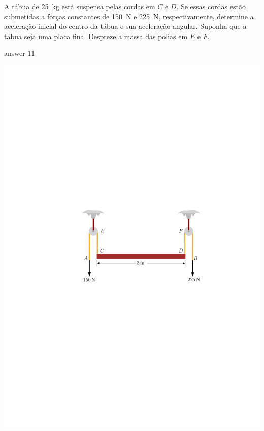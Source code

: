 \item A tábua de \SI{25}{\kilogram} está suspensa pelas cordas em $C$ e $D$. Se essas cordas estão submetidas a forças constantes de \SI{150}{\newton} e \SI{225}{\newton}, respectivamente, determine a aceleração inicial do centro da tábua e sua aceleração angular. Suponha que a tábua seja uma placa fina. Despreze a massa das polias em $E$ e $F$.

{answer-11}

\vspace{-1.4cm}
\begin{flushright}
	\includegraphics[scale=1]{../../images/draw_10}
\end{flushright}